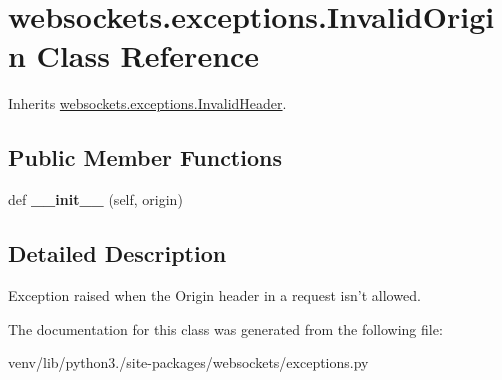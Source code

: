 \hypertarget{classwebsockets_1_1exceptions_1_1_invalid_origin}{}\section{websockets.\+exceptions.\+Invalid\+Origin Class Reference}
\label{classwebsockets_1_1exceptions_1_1_invalid_origin}


Inherits \hyperlink{classwebsockets_1_1exceptions_1_1_invalid_header}{websockets.\+exceptions.\+Invalid\+Header}.

\subsection*{Public Member Functions}
\begin{DoxyCompactItemize}
\item 
\mbox{\label{classwebsockets_1_1exceptions_1_1_invalid_origin_a32b7316759b6e3db33a7e61e42afad85}} 
def {\bfseries \+\_\+\+\_\+init\+\_\+\+\_\+} (self, origin)
\end{DoxyCompactItemize}


\subsection{Detailed Description}
\begin{DoxyVerb}Exception raised when the Origin header in a request isn't allowed.\end{DoxyVerb}
 

The documentation for this class was generated from the following file\+:\begin{DoxyCompactItemize}
\item 
venv/lib/python3./site-\/packages/websockets/exceptions.\+py\end{DoxyCompactItemize}
